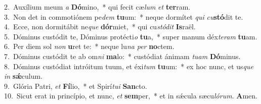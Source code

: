 {2.~}Auxílium meum \textit{a} \textbf{Dó}mino,~* qui fecit cæ\textit{lum} \textit{et} \textbf{ter}ram.\\
{3.~}Non det in commotiónem pe\textit{dem} \textbf{tu}um:~* neque dormítet \textit{qui} \textit{cu}\textbf{stó}dit te.\\
{4.~}Ecce, non dormitábit ne\textit{que} \textbf{dór}miet,~* qui cu\textit{stó}\textit{dit} \textbf{Is}raël.\\
{5.~}Dóminus custódit te, Dóminus protécti\textit{o} \textbf{tu}a,~* super manum déx\textit{te}\textit{ram} \textbf{tu}am.\\
{6.~}Per diem sol \textit{non} \textbf{u}ret te:~* neque lu\textit{na} \textit{per} \textbf{no}ctem.\\
{7.~}Dóminus custódit te ab om\textit{ni} \textbf{ma}lo:~* custódiat ánimam \textit{tu}\textit{am} \textbf{Dó}minus.\\
{8.~}Dóminus custódiat intróitum tuum, et éxi\textit{tum} \textbf{tu}um:~* ex hoc nunc, et us\textit{que} \textit{in} \textbf{sǽ}culum.\\
{9.~}Glória Patri, \textit{et} \textbf{Fí}lio,~* et Spirí\textit{tu}\textit{i} \textbf{San}cto.\\
{10.~}Sicut erat in princípio, et nunc, \textit{et} \textbf{sem}per,~* et in sǽcula sæcu\textit{ló}\textit{rum}. \textbf{A}men.\\
